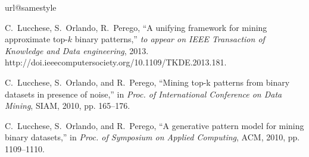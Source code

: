 \documentclass{article}
\begin{document}


\begin{thebibliography}{10}
\providecommand{\url}[1]{#1}
\csname url@samestyle\endcsname
\providecommand{\newblock}{\relax}
\providecommand{\bibinfo}[2]{#2}
\providecommand{\BIBentrySTDinterwordspacing}{\spaceskip=0pt\relax}
\providecommand{\BIBentryALTinterwordstretchfactor}{4}
\providecommand{\BIBentryALTinterwordspacing}{\spaceskip=\fontdimen2\font plus
\BIBentryALTinterwordstretchfactor\fontdimen3\font minus
  \fontdimen4\font\relax}
\providecommand{\BIBforeignlanguage}[2]{{%
\expandafter\ifx\csname l@#1\endcsname\relax
\typeout{** WARNING: IEEEtran.bst: No hyphenation pattern has been}%
\typeout{** loaded for the language `#1'. Using the pattern for}%
\typeout{** the default language instead.}%
\else
\language=\csname l@#1\endcsname
\fi
#2}}
\providecommand{\BIBdecl}{\relax}
\BIBdecl

C.~Lucchese, S.~Orlando, R.~Perego, ``A unifying framework for mining approximate top-$k$ binary patterns,'' \emph{to appear on IEEE Transaction of Knowledge and Data engineering}, 2013. \url{http://doi.ieeecomputersociety.org/10.1109/TKDE.2013.181}.

C.~Lucchese, S.~Orlando, and R.~Perego, ``Mining top-k patterns from binary
  datasets in presence of noise,'' in \emph{Proc. of International Conference on Data Mining},
  SIAM, 2010, pp. 165--176.

C.~Lucchese, S.~Orlando, and R.~Perego, ``A generative pattern model for mining
  binary datasets,'' in \emph{Proc. of Symposium on Applied Computing}, ACM,
  2010, pp. 1109--1110.  

\end{thebibliography}

\end{document}
